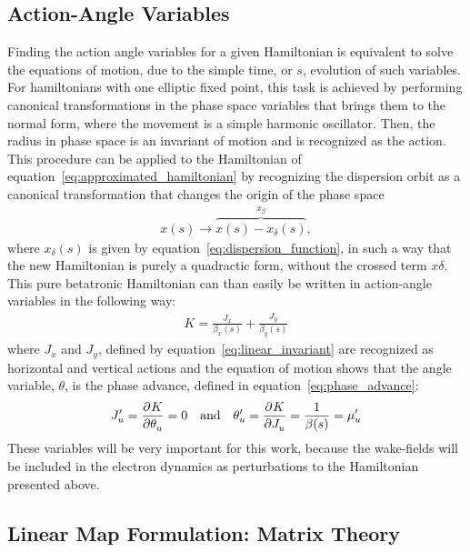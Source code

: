 \subsection{Action-Angle Variables}

    Finding the action angle variables for a given Hamiltonian is equivalent to solve the equations of motion, due to the simple time, or $s$, evolution of such variables. For  hamiltonians with one elliptic fixed point, this task is achieved by performing canonical transformations in the phase space variables that brings them to the normal form, where the movement is a simple harmonic oscillator. Then, the radius in phase space is an invariant of motion and is recognized as the action. This procedure can be applied to the Hamiltonian of equation~\eqref{eq:approximated_hamiltonian} by recognizing the dispersion orbit as a canonical transformation that changes the origin of the phase space~\cite[Appendix A2]{Berg1996}
    \begin{align}\label{eq:off_momentum_canonical_transformation}
        x (s) \to \overbrace{x(s) - x_\delta (s)}^{x_\beta},
    \end{align}
    where $x_\delta (s)$ is given by equation~\eqref{eq:dispersion_function}, in such a way that the new Hamiltonian is purely a quadractic form, without the crossed term $x\delta$. This pure betatronic Hamiltonian can than easily be written in action-angle variables in the following way:
    \begin{align}\label{eq:betatron_hamiltonian}
        K = \frac{J_x}{\beta_x(s)} + \frac{J_y}{\beta_y(s)}
    \end{align}
    where $J_x$ and $J_y$, defined by equation~\eqref{eq:linear_invariant} are recognized as horizontal and vertical actions and the equation of motion shows that the angle variable, $\theta$, is the phase advance, defined in equation~\eqref{eq:phase_advance}:
    \begin{align}
        J'_u = \frac{\partial^{{}}K}{\partial \theta_u^{{}}} = 0 \quad \text{and} \quad \theta'_u = \frac{\partial^{{}}K}{\partial J_u^{{}}} = \frac{1}{\beta(s)} = \mu'_u
    \end{align}
    These variables will be very important for this work, because the wake-fields will be included in the electron dynamics as perturbations to the Hamiltonian presented above.

\subsection{Linear Map Formulation: Matrix Theory}


